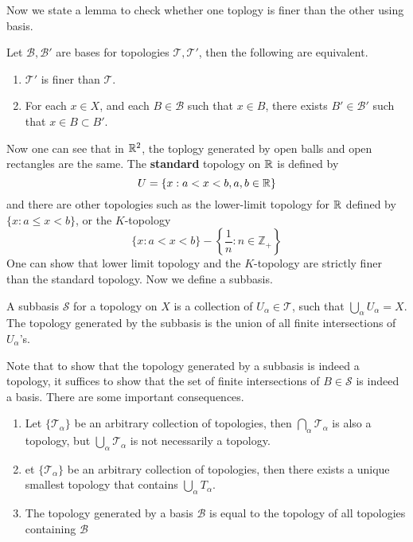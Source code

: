 Now we state a lemma to check whether one toplogy is finer than the other using basis.
\begin{lem}
    Let $\mathcal{B}, \mathcal{B}'$ are bases for topologies $\mathcal{T}, \mathcal{T}'$, then the following are equivalent.
    \begin{enumerate}
        \item $\mathcal{T}'$ is finer than $\mathcal{T}$.
        \item For each $x\in X$, and each $B\in\mathcal{B}$ such that $x\in B$, there exists $B'\in\mathcal{B}'$ such that $x\in B\subset B'$.
    \end{enumerate}
\end{lem}
Now one can see that in $\mathbb{R}^2$, the toplogy generated by open balls and open rectangles are the same. The \textbf{standard} topology on $\mathbb{R}$ is defined by 
\begin{equation*}
    U=\{x: a<x<b, a,b\in\mathbb{R}\}
\end{equation*}
and there are other topologies such as the lower-limit topology for $\mathbb{R}$  defined by $\{x: a\leq x< b\}$, or the $K$-topology
\begin{equation*}
    \{x: a<x<b\}-\left\{\frac{1}{n}: n\in\mathbb{Z}_+\right\}
\end{equation*}
One can show that lower limit topology and the $K$-topology are strictly finer than the standard topology. Now we define a subbasis.
\begin{defn}[subbasis]
    A subbasis $\mathcal{S}$ for a topology on $X$ is a collection of $U_\alpha\in\mathcal{T}$, such that $\bigcup_\alpha U_\alpha=X$. The topology generated by the subbasis is the union of all finite intersections of $U_\alpha$'s.
\end{defn}
Note that to show that the topology generated by a subbasis is indeed a topology, it suffices to show that the set of finite intersections of $B\in\mathcal{S}$ is indeed a basis. There are some important consequences.
\begin{enumerate}
    \item Let $\{\mathcal{T}_\alpha\}$ be an arbitrary collection of topologies, then $\bigcap_\alpha\mathcal{T}_\alpha$ is also a topology, but $\bigcup_\alpha\mathcal{T}_\alpha$ is not necessarily a topology.
    \item et $\{\mathcal{T}_\alpha\}$ be an arbitrary collection of topologies, then there exists a unique smallest topology that contains $\bigcup_\alpha T_\alpha$.
    \item The topology generated by a basis $\mathcal{B}$ is equal to the topology of all topologies containing $\mathcal{B}$
\end{enumerate}

